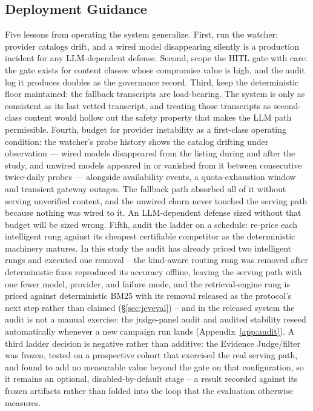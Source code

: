 \subsection{Deployment Guidance}
Five lessons from operating the system generalize. First, run the
watcher: provider catalogs drift, and a wired model disappearing silently
is a production incident for any LLM-dependent defense. Second, scope the
HITL gate with care: the gate exists for content classes whose
compromise value is high, and the audit log it produces doubles as the
governance record. Third, keep the deterministic floor maintained: the
fallback transcripts are load-bearing. The system is only as consistent
as its last vetted transcript, and treating those transcripts as second-class
content would hollow out the safety property that makes the LLM path
permissible. Fourth, budget for provider instability as a first-class
operating condition: the watcher's probe history shows the catalog
drifting under observation --- wired models disappeared from the listing
during and after the study, and unwired models appeared in or vanished
from it between consecutive twice-daily probes --- alongside availability
events, a quota-exhaustion window and transient gateway outages. The fallback
path absorbed all of it without serving unverified content, and the
unwired churn never touched the serving path because nothing was wired
to it. An
LLM-dependent defense sized without that budget will be sized wrong.
Fifth, audit the ladder on a schedule: re-price each intelligent rung
against its cheapest certifiable competitor as the deterministic
machinery matures. In this study the audit has already priced two
intelligent rungs and executed one removal -- the kind-aware routing
rung was removed after deterministic fixes reproduced its accuracy
offline, leaving the serving path with one fewer model, provider, and
failure mode, and the retrieval-engine rung is priced against
deterministic BM25 with its removal released as the protocol's next
step rather than claimed (\S\ref{sec:jeveval}) -- and in the released
system the audit is not a manual exercise: the judge-panel audit and
audited stability reseed automatically whenever a new campaign run lands
(Appendix~\ref{app:audit}). A third ladder decision is negative rather
than additive: the Evidence Judge/filter was frozen, tested on a
prospective cohort that exercised the real serving path, and found to
add no measurable value beyond the gate on that configuration, so it
remains an optional, disabled-by-default stage -- a result recorded
against its frozen artifacts rather than folded into the loop that the
evaluation otherwise measures.

